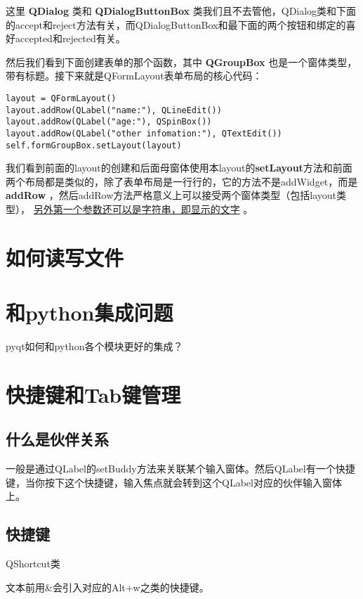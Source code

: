\documentclass[11pt,oneside]{article}
\begin{document}
这里 \textbf{QDialog} 类和 \textbf{QDialogButtonBox} 类我们且不去管他，QDialog类和下面的accept和reject方法有关，而QDialogButtonBox和最下面的两个按钮和绑定的喜好accepted和rejected有关。

然后我们看到下面创建表单的那个函数，其中 \textbf{QGroupBox} 也是一个窗体类型，带有标题。接下来就是QFormLayout表单布局的核心代码：
\begin{Verbatim}
layout = QFormLayout()
layout.addRow(QLabel("name:"), QLineEdit())
layout.addRow(QLabel("age:"), QSpinBox())
layout.addRow(QLabel("other infomation:"), QTextEdit())
self.formGroupBox.setLayout(layout)
\end{Verbatim}


我们看到前面的layout的创建和后面母窗体使用本layout的\textbf{setLayout}方法和前面两个布局都是类似的，除了表单布局是一行行的，它的方法不是addWidget，而是 \textbf{addRow} ，然后addRow方法严格意义上可以接受两个窗体类型（包括layout类型）， \uline{另外第一个参数还可以是字符串，即显示的文字} 。






\section{如何读写文件}
\label{sec:orgheadline38}

\section{和python集成问题}
\label{sec:orgheadline39}
pyqt如何和python各个模块更好的集成？


\section{快捷键和Tab键管理}
\label{sec:orgheadline46}
\subsection{什么是伙伴关系}
\label{sec:orgheadline40}
一般是通过QLabel的setBuddy方法来关联某个输入窗体。然后QLabel有一个快捷键，当你按下这个快捷键，输入焦点就会转到这个QLabel对应的伙伴输入窗体上。

\subsection{快捷键}
\label{sec:orgheadline41}
QShortcut类

文本前用\&会引入对应的Alt+w之类的快捷键。
\end{document}
